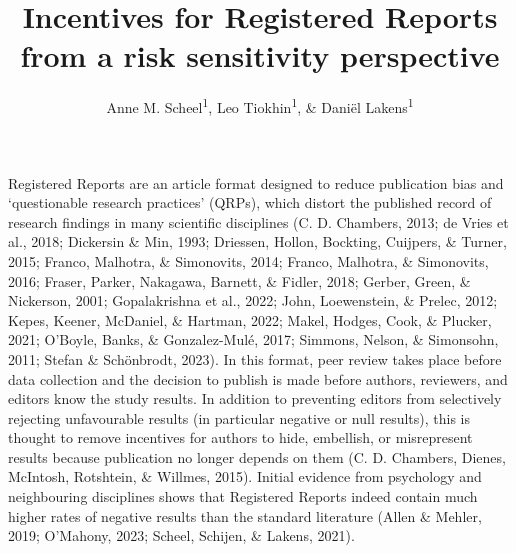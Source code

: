 \documentclass[
  ,man,mask,floatsintext]{apa6}
\title{Incentives for Registered Reports from a risk sensitivity perspective}
\author{Anne M. Scheel\textsuperscript{1}, Leo Tiokhin\textsuperscript{1}, \& Daniël Lakens\textsuperscript{1}}
\date{}
\affiliation{\vspace{0.5cm}\textsuperscript{1} Eindhoven University of Technology}
\begin{document}
\maketitle

Registered Reports are an article format designed to reduce publication bias and `questionable research practices' (QRPs), which distort the published record of research findings in many scientific disciplines (C. D. Chambers, 2013; de Vries et al., 2018; Dickersin \& Min, 1993; Driessen, Hollon, Bockting, Cuijpers, \& Turner, 2015; Franco, Malhotra, \& Simonovits, 2014; Franco, Malhotra, \& Simonovits, 2016; Fraser, Parker, Nakagawa, Barnett, \& Fidler, 2018; Gerber, Green, \& Nickerson, 2001; Gopalakrishna et al., 2022; John, Loewenstein, \& Prelec, 2012; Kepes, Keener, McDaniel, \& Hartman, 2022; Makel, Hodges, Cook, \& Plucker, 2021; O'Boyle, Banks, \& Gonzalez-Mulé, 2017; Simmons, Nelson, \& Simonsohn, 2011; Stefan \& Schönbrodt, 2023).
In this format, peer review takes place before data collection and the decision to publish is made before authors, reviewers, and editors know the study results.
In addition to preventing editors from selectively rejecting unfavourable results (in particular negative or null results), this is thought to remove incentives for authors to hide, embellish, or misrepresent results because publication no longer depends on them
(C. D. Chambers, Dienes, McIntosh, Rotshtein, \& Willmes, 2015).
Initial evidence from psychology and neighbouring disciplines shows that Registered Reports indeed contain much higher rates of negative results than the standard literature (Allen \& Mehler, 2019; O'Mahony, 2023; Scheel, Schijen, \& Lakens, 2021).
\end{document}
